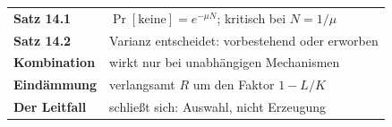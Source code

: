 \begin{merksatz}
\begin{center}
\renewcommand{\arraystretch}{1.5}
\begin{tabular}{@{}P{3.0cm}P{5.6cm}@{}}
\toprule
\textbf{Satz 14.1} & $\Pr[\text{keine}] = e^{-\mu N}$; kritisch bei $N = 1/\mu$\\
\textbf{Satz 14.2} & Varianz entscheidet: vorbestehend oder erworben\\
\textbf{Kombination} & wirkt nur bei unabhängigen Mechanismen\\
\textbf{Eindämmung} & verlangsamt $R$ um den Faktor $1-L/K$\\
\textbf{Der Leitfall} & schließt sich: Auswahl, nicht Erzeugung\\
\bottomrule
\end{tabular}
\end{center}

\begin{center}
\begin{minipage}{0.88\textwidth}
\end{minipage}
\end{center}
\end{merksatz}

